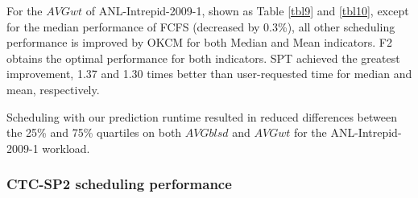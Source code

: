 \documentclass[a4paper,fleqn]{cas-sc}
\begin{document}
For the $A\!V\!Gwt$ of ANL-Intrepid-2009-1, shown as Table \ref{tbl9} and \ref{tbl10}, except for the median performance of FCFS (decreased by 0.3\%), all other scheduling performance is improved by OKCM for both Median and Mean indicators. F2 obtains the optimal performance for both indicators. SPT achieved the greatest improvement, 1.37 and 1.30 times better than user-requested time for median and mean, respectively.

Scheduling with our prediction runtime resulted in reduced differences between the 25\% and 75\% quartiles on both $A\!V\!Gblsd$ and $A\!V\!Gwt$ for the ANL-Intrepid-2009-1 workload.

\subsubsection{CTC-SP2 scheduling performance}
\end{document}
